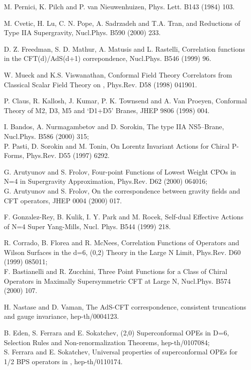 \documentclass[a4paper,11pt]{article}
\begin{document}
\begin{thebibliography}{99}
M. Pernici, K. Pilch and P. van Nieuwenhuizen, Phys. Lett. B143 (1984) 103.


M. Cvetic, H. Lu, C. N. Pope, A. Sadrzadeh and T.A. Tran, \coordHE{}
and \coordHE{} Reductions of Type IIA Supergravity, Nucl.Phys. B590
(2000) 233.



D. Z. Freedman, S. D. Mathur, A. Matusis and L. Rastelli,
Correlation functions in the CFT(d)/AdS(d+1) correpondence,
Nucl.Phys. B546 (1999) 96.

W. Mueck and K.S. Viswanathan,
Conformal Field Theory Correlators from Classical Scalar Field Theory on
\coordHE{}, Phys.Rev. D58 (1998) 041901.


P. Claus, R. Kallosh, J. Kumar, P. K. Townsend and A. Van Proeyen,
Conformal Theory of M2, D3, M5 and `D1+D5' Branes, JHEP 9806 (1998) 004.


I. Bandos, A. Nurmagambetov and D. Sorokin, The type IIA
NS5--Brane, Nucl.Phys. B586 (2000) 315;\\
P. Pasti, D. Sorokin and M. Tonin, On Lorentz Invariant Actions
for Chiral P-Forms, Phys.Rev. D55 (1997) 6292.


G. Arutyunov and S. Frolov,
Four-point Functions of Lowest Weight CPOs in N=4 \coordHE{} in Supergravity Approximation,
Phys.Rev. D62 (2000) 064016;\\
G. Arutyunov and S. Frolov,
On the correspondence between gravity fields and CFT operators,
JHEP 0004 (2000) 017.

F. Gonzalez-Rey, B. Kulik, I. Y. Park and M. Rocek, Self-dual
Effective Actions of N=4 Super Yang-Mills, Nucl. Phys. B544 (1999)
218.


R. Corrado, B. Florea and R. McNees, Correlation Functions of
Operators and Wilson Surfaces in the d=6, (0,2) Theory in
the Large N Limit, Phys.Rev. D60 (1999) 085011;\\
F. Bastianelli and R. Zucchini, Three Point Functions for a Class
of Chiral Operators in Maximally Supersymmetric CFT at Large N,
Nucl.Phys. B574 (2000) 107.

H. Nastase and D. Vaman, The AdS-CFT correspondence, consistent
truncations and gauge invariance, hep-th/0004123.

B. Eden, S. Ferrara and E. Sokatchev, (2,0) Superconformal OPEs in
D=6, Selection Rules and Non-renormalization Theorems,
hep-th/0107084;\\
S. Ferrara and E. Sokatchev, Universal properties of
superconformal OPEs for 1/2 BPS operators in \coordHE{},
hep-th/0110174.















\end{thebibliography}
\end{document}
